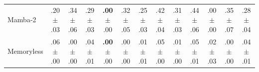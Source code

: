 \begin{table}[t]
\begin{tabular}{@{}l ccc ccc ccc ccc@{}}
Mamba-2 & .20{\scriptsize$\pm$.03} & .34{\scriptsize$\pm$.06} & .29{\scriptsize$\pm$.03} & \textbf{.00}{\scriptsize$\pm$.00} & .32{\scriptsize$\pm$.05} & .25{\scriptsize$\pm$.03} & .42{\scriptsize$\pm$.04} & .31{\scriptsize$\pm$.03} & .44{\scriptsize$\pm$.06} & .00{\scriptsize$\pm$.00} & .35{\scriptsize$\pm$.07} & .28{\scriptsize$\pm$.04} \\
Memoryless & .06{\scriptsize$\pm$.00} & .00{\scriptsize$\pm$.00} & .04{\scriptsize$\pm$.01} & \textbf{.00}{\scriptsize$\pm$.00} & .00{\scriptsize$\pm$.00} & .01{\scriptsize$\pm$.01} & .05{\scriptsize$\pm$.00} & .01{\scriptsize$\pm$.00} & .05{\scriptsize$\pm$.01} & .02{\scriptsize$\pm$.03} & .00{\scriptsize$\pm$.00} & .04{\scriptsize$\pm$.01} \\
\bottomrule\end{tabular}\end{table}

